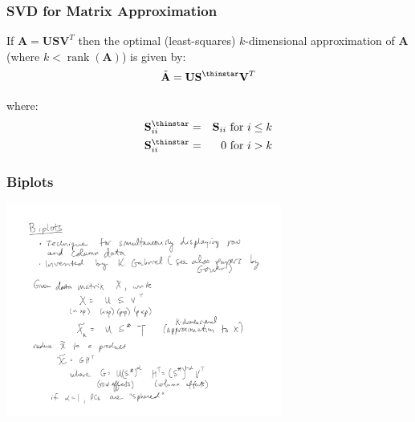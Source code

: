\documentclass{beamer}
\newcommand{\Mtx}[1]{\ensuremath{\mathbf{#1}}}
\DeclareMathOperator{\rank}{rank}
\begin{document}
\begin{frame}
  \frametitle{SVD for Matrix Approximation}

If $ \Mtx{A} = \Mtx{U} \Mtx{S} \Mtx{V}^T $
then the optimal (least-squares) $k$-dimensional approximation of \Mtx{A} (where $ k < \rank(\Mtx{A})$) is given by:
$$ \tilde{\Mtx{A}} = \Mtx{U}\Mtx{S}^{\thinstar} \Mtx{V}^T$$ 

where:
\begin{eqnarray*}
\Mtx{S}_{ii}^{\thinstar} &=& \Mtx{S}_{ii} \text{ for } i \leq k\\
\Mtx{S}_{ii}^{\thinstar} &=& 0 \text{ for } i > k\\
\end{eqnarray*}

\end{frame}


\begin{frame}
  \frametitle{Biplots}


\begin{center}
\includegraphics[height=2.75in]{about-biplots}
\end{center}

\end{frame}

\end{document}
